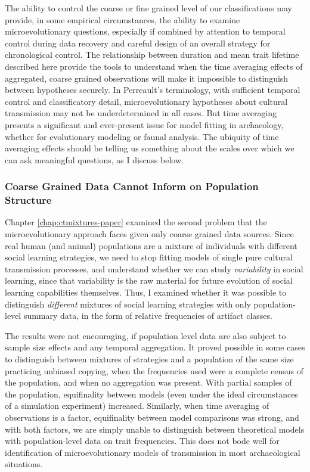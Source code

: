 The ability to control the coarse or fine grained level of our classifications may provide, in some empirical circumstances, the ability to examine microevolutionary questions, especially if combined by attention to temporal control during data recovery and careful design of an overall strategy for chronological control.  The relationship between duration and mean trait lifetime described here provide the tools to understand when the time averaging effects of aggregated, coarse grained observations will make it impossible to distinguish between hypotheses securely.  In Perreault's \citeyearpar{perreault2019quality} terminology, with sufficient temporal control and classificatory detail, microevolutionary hypotheses about cultural transmission may not be underdetermined in all cases.  But time averaging presents a significant and ever-present issue for model fitting in archaeology, whether for evolutionary modeling or faunal analysis.  The ubiquity of time averaging effects should be telling us something about the scales over which we can ask meaningful questions, as I discuss below.

\subsubsection{Coarse Grained Data Cannot Inform on Population Structure}\label{conc:sec:conc-ctmixtures}

Chapter \ref{chap:ctmixtures-paper} examined the second problem that the microevolutionary approach faces given only coarse grained data sources.  Since real human (and animal) populations are a mixture of individuals with different social learning strategies, we need to stop fitting models of single pure cultural transmission processes, and understand whether we can study \emph{variability} in social learning, since that variability is the raw material for future evolution of social learning capabilities themselves.  Thus, I examined whether it was possible to distinguish \emph{different} mixtures of social learning strategies with only population-level summary data, in the form of relative frequencies of artifact classes.

The results were not encouraging, if population level data are also subject to sample size effects and any temporal aggregation.  It proved possible in some cases to distinguish between mixtures of strategies and a population of the same size practicing unbiased copying, when the frequencies used were a complete census of the population, and when no aggregation was present.  With partial samples of the population, equifinality between models (even under the ideal circumstances of a simulation experiment) increased.  Similarly, when time averaging of observations is a factor, equifinality between model comparisons was strong, and with both factors, we are simply unable to distinguish between theoretical models with population-level data on trait frequencies.  This does not bode well for identification of microevolutionary models of transmission in most archaeological situations.  

